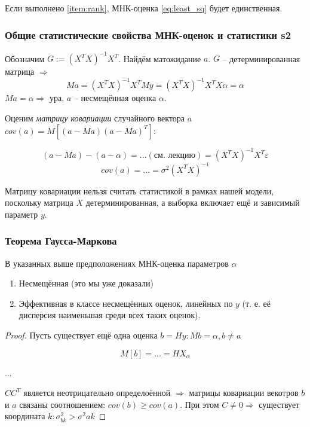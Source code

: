 \documentclass[main.tex]{subfiles}
\begin{document}
Если выполнено \ref{item:rank}, МНК-оценка \eqref{eq:least_sq} будет единственная.

\subsubsection{Общие статистические свойства МНК-оценок и статистики s2}

Обозначим $ G := (X^T X)^{-1} X^T $.
Найдём матожидание $a$. $ G $ -- детерминированная матрица $ \Rightarrow $
$$ Ma = (X^T X)^{-1} X^TMy = (X^T X)^{-1} X^T X \alpha = \alpha $$
$ Ma = \alpha \Rightarrow $ ура, $ a $ -- несмещённая оценка $ \alpha $.

Оценим \emph{матрицу ковариации} случайного вектора $a$ $ cov(a) = M[(a-Ma)(a-Ma)^T] $:

$$ (a-Ma) - (a-\alpha) = ... (\text{см. лекцию}) = (X^T X)^{-1} X^T \varepsilon $$
$$ cov(a) = ... = \sigma^2(X^T X)^{-1} $$

Матрицу ковариации нельзя считать статистикой в рамках нашей модели, поскольку матрица $ X $ детерминированная, а выборка включает ещё и зависимый параметр $ y $.

\subsubsection{Теорема Гаусса-Маркова}

\begin{theorem}
В указанных выше предположениях МНК-оценка параметров $ \alpha $

\begin{enumerate}[noitemsep]
    \item Несмещённая (это мы уже доказали)
    \item Эффективная в классе несмещённых оценок, линейных по $y$ (т. е. её дисперсия наименьшая среди всех таких оценок).
\end{enumerate}
\end{theorem}
\begin{proof}
Пусть существует ещё одна оценка $ b = Hy: Mb = \alpha, b \ne a $

$$ M[b]= ... =HX_{\alpha} $$

...

$ CC^T $ является неотрицательно определоённой $ \Rightarrow $ матрицы ковариации векотров $ b $ и $ a $ связаны соотношением: $ cov(b) \ge cov(a) $.
При этом $ C \ne 0 \Rightarrow $ существует координата $ k: \sigma^2_{bk} > \sigma^2{ak} $

\end{proof}
\end{document}
